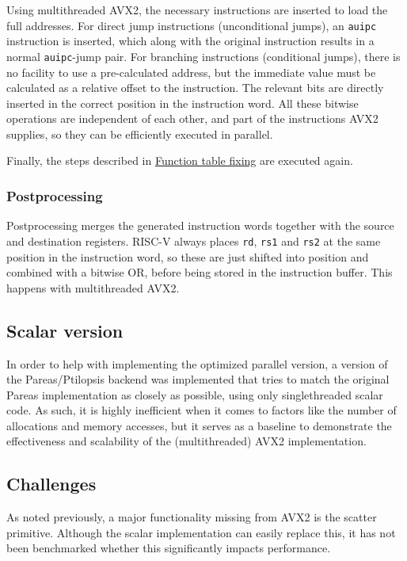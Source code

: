 \documentclass[11pt,dvipsnames]{article}
\newcommand{\mono}[1]{\texttt{#1}}
\begin{document}
Using multithreaded AVX2, the necessary instructions are inserted to load the full addresses. For direct jump instructions (unconditional jumps), an \mono{auipc} instruction is inserted, which along with the original instruction results in a normal \mono{auipc}-jump pair. For branching instructions (conditional jumps), there is no facility to use a pre-calculated address, but the immediate value must be calculated as a relative offset to the instruction. The relevant bits are directly inserted in the correct position in the instruction word. All these bitwise operations are independent of each other, and part of the instructions AVX2 supplies, so they can be efficiently executed in parallel.

Finally, the steps described in \hyperref[functab]{Function table fixing} are executed again.

\subsubsection{Postprocessing}
Postprocessing merges the generated instruction words together with the source and destination registers. RISC-V always places \mono{rd}, \mono{rs1} and \mono{rs2} at the same position in the instruction word, so these are just shifted into position and combined with a bitwise OR, before being stored in the instruction buffer. This happens with multithreaded AVX2.

\subsection{Scalar version}
In order to help with implementing the optimized parallel version, a version of the Pareas/Ptilopsis backend was implemented that tries to match the original Pareas implementation as closely as possible, using only singlethreaded scalar code. As such, it is highly inefficient when it comes to factors like the number of allocations and memory accesses, but it serves as a baseline to demonstrate the effectiveness and scalability of the (multithreaded) AVX2 implementation.

\subsection{Challenges}
As noted previously, a major functionality missing from AVX2 is the scatter primitive. Although the scalar implementation can easily replace this, it has not been benchmarked whether this significantly impacts performance. 
\end{document}
